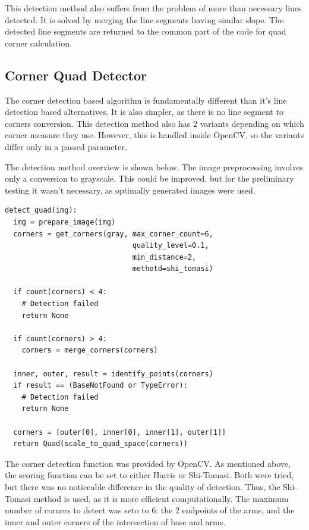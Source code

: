 This detection method also suffers from the problem of more than necessary lines detected.
It is solved by merging the line segments having similar slope.
The detected line segments are returned to the common part of the code for quad corner calculation.

\subsection{Corner Quad Detector}

The corner detection based algorithm is fundamentally different than it's line detection based alternatives.
It is also simpler, as there is no line segment to corners conversion.
This detection method also has 2 variants depending on which corner measure they use.
However, this is handled inside OpenCV, so the variants differ only in a passed parameter.

The detection method overview is shown below.
The image preprocessing involves only a conversion to grayscale.
This could be improved, but for the preliminary testing it wasn't necessary, as optimally generated images were used.
\begin{lstlisting}
detect_quad(img):
  img = prepare_image(img)
  corners = get_corners(gray, max_corner_count=6, 
                              quality_level=0.1, 
                              min_distance=2, 
                              methotd=shi_tomasi)
	
  if count(corners) < 4:
    # Detection failed
    return None
	
  if count(corners) > 4:
    corners = merge_corners(corners)
	 
  inner, outer, result = identify_points(corners)
  if result == (BaseNotFound or TypeError):
    # Detection failed
    return None
	
  corners = [outer[0], inner[0], inner[1], outer[1]]	
  return Quad(scale_to_quad_space(corners))
\end{lstlisting}

The corner detection function was provided by OpenCV.
As mentioned above, the scoring function can be set to either Harris or Shi-Tomasi.
Both were tried, but there was no noticeable difference in the quality of detection.
Thus, the Shi-Tomasi method is used, as it is more efficient computationally.
The maximum number of corners to detect was seto to 6: the 2 endpoints of the arms, and the inner and outer corners of the intersection of base and arms.

